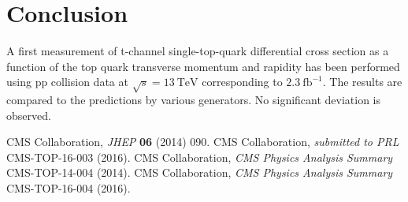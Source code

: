 \documentclass[12pt]{article}
\begin{document}
\section{Conclusion}

A first measurement of t-channel single-top-quark differential cross section as a function of the top quark transverse momentum and rapidity has been performed using pp collision data at $\sqrt{s}=13~\mathrm{TeV}$ corresponding to $2.3~\mathrm{fb}^{-1}$. The results are compared to the predictions by various generators. No significant deviation is observed.

\begin{thebibliography}{99}

 CMS Collaboration, \emph{JHEP} \textbf{06} (2014) 090.
 CMS Collaboration, \emph{submitted to PRL} CMS-TOP-16-003 (2016).
 CMS Collaboration, \emph{CMS Physics Analysis Summary} CMS-TOP-14-004 (2014).
 CMS Collaboration, \emph{CMS Physics Analysis Summary} CMS-TOP-16-004 (2016).

\end{thebibliography}

 
\end{document}
